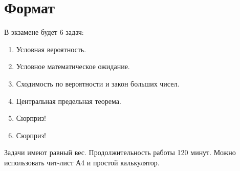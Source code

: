 \documentclass[12pt]{article}
\begin{document}
\section*{Формат}

В экзамене будет 6 задач:
\begin{enumerate}
    \item Условная вероятность.
    \item Условное математическое ожидание. 
    \item Сходимость по вероятности и закон больших чисел.
    \item Центральная предельная теорема. 
    \item Сюрприз!
    \item Сюрприз!
\end{enumerate}
Задачи имеют равный вес. 
Продолжительность работы 120 минут. 
Можно использовать чит-лист А4 и простой калькулятор.
\end{document}
